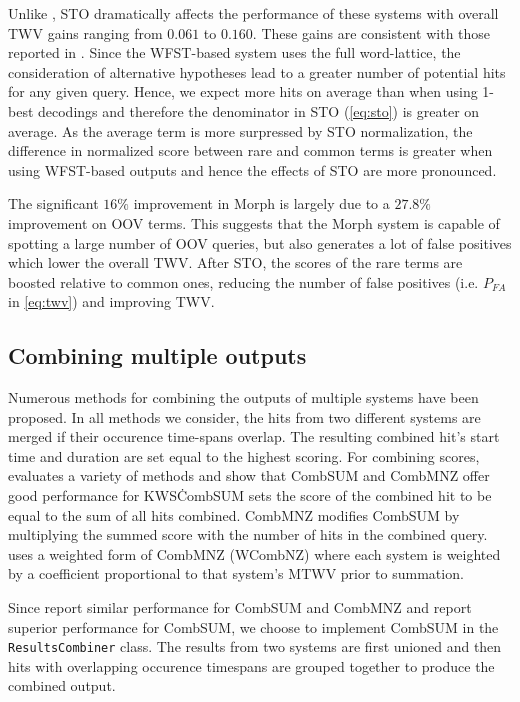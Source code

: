 \documentclass[a4paper,oneside,reqno]{amsart}
\begin{document}
Unlike \label{tab:sto}, STO dramatically affects the performance of these
systems with overall TWV gains ranging from $0.061$ to $0.160$. These gains are
consistent with those reported in \cite{mamou2013system}. Since the WFST-based
system uses the full word-lattice, the consideration of alternative hypotheses
lead to a greater number of potential hits for any given query. Hence, we
expect more hits on average than when using 1-best decodings and therefore the
denominator in STO (\autoref{eq:sto}) is greater on average. As the average
term is more surpressed by STO normalization, the difference in normalized
score between rare and common terms is greater when using WFST-based outputs
and hence the effects of STO are more pronounced.

The significant $16\%$ improvement in Morph is largely due to a $27.8\%$
improvement on OOV terms. This suggests that the Morph system is capable of
spotting a large number of OOV queries, but also generates a lot of false
positives which lower the overall TWV. After STO, the scores of the rare
terms are boosted relative to common ones, reducing the number of false
positives (i.e. $P_{FA}$ in \autoref{eq:twv}) and improving TWV.

\subsection{Combining multiple outputs}

Numerous methods for combining the outputs of multiple systems have been
proposed. In all methods we consider, the hits from two different systems are
merged if their occurence time-spans overlap. The resulting combined hit's
start time and duration are set equal to the highest scoring. For combining
scores, \cite{soto2014comparison} evaluates a variety of methods and show that
CombSUM and CombMNZ offer good performance for KWS\. CombSUM sets the score of
the combined hit to be equal to the sum of all hits combined. CombMNZ modifies
CombSUM by multiplying the summed score with the number of hits in the combined
query. \cite{mamou2013system} uses a weighted form of CombMNZ (WCombNZ) where
each system is weighted by a coefficient proportional to that system's MTWV
prior to summation.

Since \cite{soto2014comparison} report similar performance for CombSUM and
CombMNZ and \cite{belkin1995combining} report superior performance for CombSUM,
we choose to implement CombSUM in the \texttt{ResultsCombiner} class. The
results from two systems are first unioned and then hits with overlapping
occurence timespans are grouped together to produce the combined output.
\end{document}

